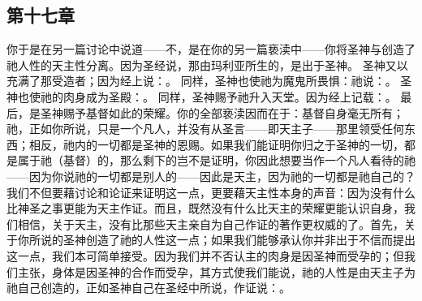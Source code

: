 \subsection{第十七章}

\par

你于是在另一篇讨论中说道——不，是在你的另一篇亵渎中——你将圣神与创造了祂人性的天主性分离。因为圣经说，那由玛利亚所生的，是出于圣神。 圣神又以充满了那受造者；因为经上说：。 同样，圣神也使祂为魔鬼所畏惧：祂说：。 圣神也使祂的肉身成为圣殿：。 同样，圣神赐予祂升入天堂。因为经上记载：。 最后，是圣神赐予基督如此的荣耀。你的全部亵渎因而在于：基督自身毫无所有；祂，正如你所说，只是一个凡人，并没有从圣言——即天主子——那里领受任何东西；相反，祂内的一切都是圣神的恩赐。如果我们能证明你归之于圣神的一切，都是属于祂（基督）的，那么剩下的岂不是证明，你因此想要当作一个凡人看待的祂——因为你说祂的一切都是别人的——因此是天主，因为祂的一切都是祂自己的？我们不但要藉讨论和论证来证明这一点，更要藉天主性本身的声音：因为没有什么比神圣之事更能为天主作证。而且，既然没有什么比天主的荣耀更能认识自身，我们相信，关于天主，没有比那些天主亲自为自己作证的著作更权威的了。首先，关于你所说的圣神创造了祂的人性这一点；如果我们能够承认你并非出于不信而提出这一点，我们本可简单接受。因为我们并不否认主的肉身是因圣神而受孕的；但我们主张，身体是因圣神的合作而受孕，其方式使我们能说，祂的人性是由天主子为祂自己创造的，正如圣神自己在圣经中所说，作证说：。 